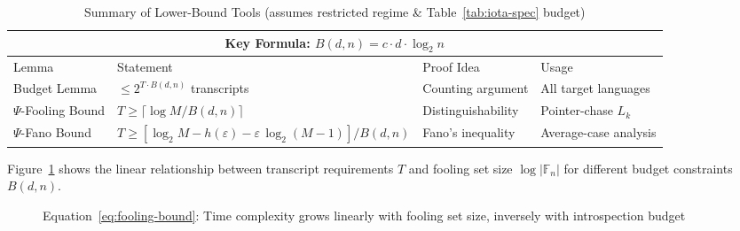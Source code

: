 \begin{remark}
\begin{table}[htbp]
\centering
\caption{Summary of Lower-Bound Tools (assumes restricted regime \& Table~\ref{tab:iota-spec} budget)}
\label{tab:lower-bound-summary}
\small
\begin{tabular}{@{}p{2.5cm}p{5.5cm}p{3cm}p{3.5cm}@{}}
\toprule
\multicolumn{4}{c}{\textbf{Key Formula: } $B(d,n) = c \cdot d \cdot \log_{2} n$} \\
\midrule
Lemma & Statement & Proof Idea & Usage \\
\midrule
Budget Lemma & $\leq 2^{T \cdot B(d,n)}$ transcripts & Counting argument & All target languages \\
$\Psi$-Fooling Bound & $T \geq \lceil \log M / B(d,n) \rceil$ & Distinguishability & Pointer-chase $L_k$ \\
$\Psi$-Fano Bound & $T \geq [\log_{2} M - h(\varepsilon) - \varepsilon \, \log_{2}(M-1)] / B(d,n)$ & Fano's inequality & Average-case analysis \\
\bottomrule
\end{tabular}
\end{table}

\begin{remark}[Visualization]
Figure~\ref{fig:bounds-visualization} shows the linear relationship between transcript requirements $T$ and fooling set size $\log|\mathbb{F}_n|$ for different budget constraints $B(d,n)$.
\end{remark}

\begin{figure}[htbp]
\centering
{}
\caption{Equation~\eqref{eq:fooling-bound}: Time complexity grows linearly with fooling set size, inversely with introspection budget}
\label{fig:bounds-visualization}
\end{figure}


\end{remark}
